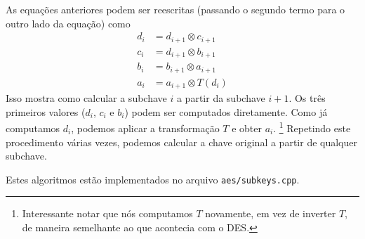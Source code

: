 \documentclass{article}
\newcommand{\xor}{\otimes}
\begin{document}
As equações anteriores podem ser reescritas
(passando o segundo termo para o outro lado da equação)
como
\begin{align*}
    d_i &= d_{i+1} \xor c_{i+1} \\
    c_i &= d_{i+1} \xor b_{i+1} \\
    b_i &= b_{i+1} \xor a_{i+1} \\
    a_i &= a_{i+1} \xor T(d_i)
\end{align*}
Isso mostra como calcular a subchave $i$ a partir da subchave $i+1$.
Os três primeiros valores ($d_i$, $c_i$ e $b_i$)
podem ser computados diretamente.
Como já computamos $d_i$, podemos aplicar a transformação $T$
e obter $a_i$.
\footnote{
    Interessante notar que nós computamos $T$ novamente,
    em vez de inverter $T$,
    de maneira semelhante ao que acontecia com o DES.
}
Repetindo este procedimento várias vezes,
podemos calcular a chave original a partir de qualquer subchave.

Estes algoritmos estão implementados no arquivo \verb"aes/subkeys.cpp".
\end{document}
